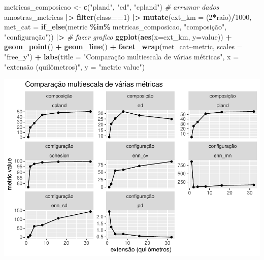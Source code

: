 \documentclass[
]{article}
\newenvironment{Shaded}{\begin{snugshade}}{\end{snugshade}}
\newcommand{\AttributeTok}[1]{\textcolor[rgb]{0.13,0.29,0.53}{#1}}
\newcommand{\CommentTok}[1]{\textcolor[rgb]{0.56,0.35,0.01}{\textit{#1}}}
\newcommand{\DecValTok}[1]{\textcolor[rgb]{0.00,0.00,0.81}{#1}}
\newcommand{\FunctionTok}[1]{\textcolor[rgb]{0.13,0.29,0.53}{\textbf{#1}}}
\newcommand{\NormalTok}[1]{#1}
\newcommand{\OtherTok}[1]{\textcolor[rgb]{0.56,0.35,0.01}{#1}}
\newcommand{\SpecialCharTok}[1]{\textcolor[rgb]{0.81,0.36,0.00}{\textbf{#1}}}
\newcommand{\StringTok}[1]{\textcolor[rgb]{0.31,0.60,0.02}{#1}}
\begin{document}
\begin{Shaded}
\begin{Highlighting}[]
\NormalTok{metricas\_composicao }\OtherTok{\textless{}{-}} \FunctionTok{c}\NormalTok{(}\StringTok{"pland"}\NormalTok{, }\StringTok{"ed"}\NormalTok{, }\StringTok{"cpland"}\NormalTok{)}
\CommentTok{\# arrumar dados}
\NormalTok{amostras\_metricas }\SpecialCharTok{|\textgreater{}} 
  \FunctionTok{filter}\NormalTok{(class}\SpecialCharTok{==}\DecValTok{1}\NormalTok{) }\SpecialCharTok{|\textgreater{}}
  \FunctionTok{mutate}\NormalTok{(}\AttributeTok{ext\_km =}\NormalTok{ (}\DecValTok{2}\SpecialCharTok{*}\NormalTok{raio)}\SpecialCharTok{/}\DecValTok{1000}\NormalTok{, }
         \AttributeTok{met\_cat =} \FunctionTok{if\_else}\NormalTok{(metric }\SpecialCharTok{\%in\%}\NormalTok{ metricas\_composicao, }
                           \StringTok{"composição"}\NormalTok{, }\StringTok{"configuração"}\NormalTok{)) }\SpecialCharTok{|\textgreater{}}
\CommentTok{\# fazer grafico}
  \FunctionTok{ggplot}\NormalTok{(}\FunctionTok{aes}\NormalTok{(}\AttributeTok{x=}\NormalTok{ext\_km, }\AttributeTok{y=}\NormalTok{value)) }\SpecialCharTok{+} 
  \FunctionTok{geom\_point}\NormalTok{() }\SpecialCharTok{+} 
  \FunctionTok{geom\_line}\NormalTok{() }\SpecialCharTok{+}
  \FunctionTok{facet\_wrap}\NormalTok{(met\_cat}\SpecialCharTok{\textasciitilde{}}\NormalTok{metric, }\AttributeTok{scales =} \StringTok{"free\_y"}\NormalTok{) }\SpecialCharTok{+}
  \FunctionTok{labs}\NormalTok{(}\AttributeTok{title =} \StringTok{"Comparação multiescala de várias métricas"}\NormalTok{,}
    \AttributeTok{x =} \StringTok{"extensão (quilômetros)"}\NormalTok{, }
    \AttributeTok{y =} \StringTok{"metric value"}\NormalTok{)}
\end{Highlighting}
\end{Shaded}

\includegraphics{epr_files/figure-latex/met-insert-fig-multiplemetrics-1.pdf}
\end{document}
